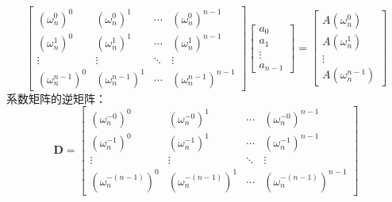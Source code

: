 \documentclass[9pt]{beamer}
\begin{document}
	\begin{frame}
		\begin{equation} \label{IDFT-equation} \begin{bmatrix} (\omega_n^0)^0 & (\omega_n^0)^1 & \cdots & (\omega_n^0)^{n-1} \\ (\omega_n^1)^0 & (\omega_n^1)^1 & \cdots & (\omega_n^1)^{n-1} \\ \vdots & \vdots & \ddots & \vdots \\ (\omega_n^{n-1})^0 & (\omega_n^{n-1})^1 & \cdots & (\omega_n^{n-1})^{n-1} \end{bmatrix} \begin{bmatrix} a_0 \\ a_1 \\ \vdots \\ a_{n-1} \end{bmatrix} = \begin{bmatrix} A(\omega_n^0) \\ A(\omega_n^1) \\ \vdots \\ A(\omega_n^{n-1}) \end{bmatrix} \end{equation}
		系数矩阵的逆矩阵：
		\begin{equation*} \mathbf D = \begin{bmatrix} (\omega_n^{-0})^0 & (\omega_n^{-0})^1 & \cdots & (\omega_n^{-0})^{n-1} \\ (\omega_n^{-1})^0 & (\omega_n^{-1})^1 & \cdots & (\omega_n^{-1})^{n-1} \\ \vdots & \vdots & \ddots & \vdots \\ (\omega_n^{-(n-1)})^0 & (\omega_n^{-(n-1)})^1 & \cdots & (\omega_n^{-(n-1)})^{n-1} \end{bmatrix} \end{equation*}
	\end{frame}
\end{document}
